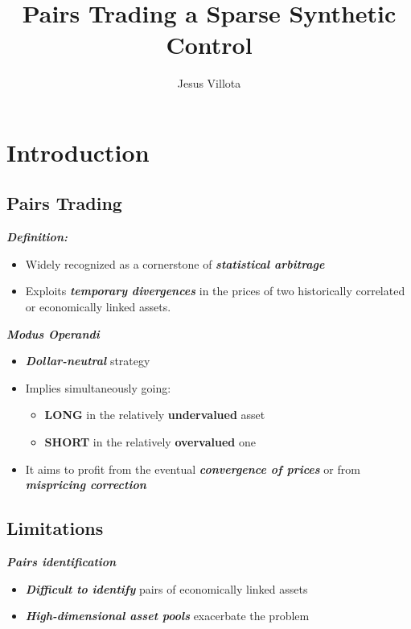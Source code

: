 \documentclass[
  letterpaper,
  DIV=11,
  numbers=noendperiod]{scrartcl}
\title{Pairs Trading a Sparse Synthetic Control}
\subtitle{Jesus Villota}
\author{}
\date{}
\providecommand{\tightlist}{%
  \setlength{\itemsep}{0pt}\setlength{\parskip}{0pt}}\usepackage{longtable,booktabs,array}
\begin{document}
\maketitle


\section{Introduction}\label{introduction}

\subsection{Pairs Trading}\label{pairs-trading}

{\textbf{\emph{Definition:}}}

\begin{itemize}
\tightlist
\item
  Widely recognized as a cornerstone of \textbf{\emph{statistical
  arbitrage}}
\item
  Exploits \textbf{\emph{temporary divergences}} in the prices of two
  historically correlated or economically linked assets.
\end{itemize}

{\textbf{\emph{Modus Operandi}}}

\begin{itemize}
\tightlist
\item
  \textbf{\emph{Dollar-neutral}} strategy
\item
  Implies simultaneously going:

  \begin{itemize}
  \tightlist
  \item
    {\textbf{LONG} in the relatively \textbf{undervalued} asset}
  \item
    {\textbf{SHORT} in the relatively \textbf{overvalued} one}
  \end{itemize}
\item
  It aims to profit from the eventual \textbf{\emph{convergence of
  prices}} or from \textbf{\emph{mispricing correction}}
\end{itemize}

\subsection{Limitations}\label{limitations}

{\textbf{\emph{Pairs identification}}}

\begin{itemize}
\tightlist
\item
  \textbf{\emph{Difficult to identify}} pairs of economically linked
  assets
\item
  \textbf{\emph{High-dimensional asset pools}} exacerbate the problem
\end{itemize}
\end{document}
